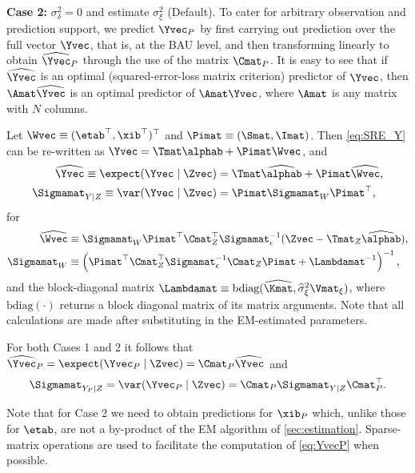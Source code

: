 {\bf Case 2:} $\sigma^2_\delta = 0$ and estimate $\sigma^2_\xi$  (Default). To cater for arbitrary observation and prediction support, we predict $\Yvec_P$ by first carrying out prediction over the full vector $\Yvec$, that is, at the BAU level, and then transforming linearly to obtain $\widehat\Yvec_P$ through the use of the matrix $\Cmat_P$. It is easy to see that if $\widehat\Yvec$ is an optimal (squared-error-loss matrix criterion) predictor of $\Yvec$, then $\Amat\widehat\Yvec$ is an optimal predictor of $\Amat\Yvec$, where $\Amat$ is any matrix with $N$ columns.

Let $\Wvec \equiv (\etab^\top,\xib^\top)^\top$ and $\Pimat \equiv (\Smat,\Imat)$. Then \eqref{eq:SRE_Y} can be re-written as $\Yvec = \Tmat\alphab + \Pimat\Wvec$, and
\begin{align}
\widehat\Yvec \equiv \expect(\Yvec \mid \Zvec) &= \Tmat\widehat\alphab + \Pimat\widehat\Wvec, \nonumber \\
\Sigmamat_{Y \mid Z} \equiv \var(\Yvec \mid \Zvec) &= \Pimat \Sigmamat_W\Pimat^\top, \label{eq:Sigma_YZ}
\end{align}
for
\begin{align*}
\widehat\Wvec &\equiv \Sigmamat_W\Pimat^\top\Cmat_Z^\top\Sigmamat_\epsilon^{-1}(\Zvec - \Tmat_Z\widehat\alphab),\\%
\Sigmamat_W &\equiv \left(\Pimat^\top \Cmat_Z^\top \Sigmamat_\epsilon^{-1} \Cmat_Z \Pimat + \Lambdamat^{-1}\right)^{-1},\\%
\end{align*}
and the block-diagonal matrix $\Lambdamat \equiv \textrm{bdiag}(\widehat\Kmat,\widehat\sigma^{2}_\xi\Vmat_{\xi})$, where $\textrm{bdiag}(\cdot)$ returns a block diagonal matrix of its matrix arguments. Note that all calculations are made after substituting in the EM-estimated parameters.

For both Cases 1 and 2 it follows that $\widehat\Yvec_P = \expect(\Yvec_P \mid \Zvec) = \Cmat_P\widehat\Yvec$ and
\begin{equation}\label{eq:YvecP}
\Sigmamat_{Y_P\mid Z} = \var(\Yvec_P \mid \Zvec) = \Cmat_P \Sigmamat_{Y \mid Z} \Cmat_P^\top.
\end{equation}

Note that for Case 2 we need to obtain predictions for $\xib_P$ which, unlike those for $\etab$, are not a by-product of the EM algorithm of \ref{sec:estimation}. Sparse-matrix operations are used to facilitate the computation of \eqref{eq:YvecP} when possible.%

